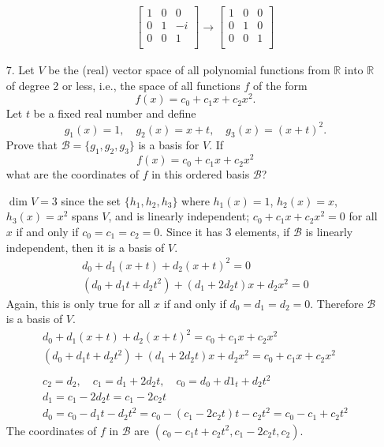 \documentclass{article}
\begin{document}
\begin{enumerate}[listparindent=\parindent]
\begin{enumerate}[listparindent=\parindent]
\begin{gather*}
\begin{bmatrix}
                1 & 0 & 0 \\
                0 & 1 & -i \\
                0 & 0 & 1 \\
            \end{bmatrix}
            \rightarrow
            \begin{bmatrix}
                1 & 0 & 0 \\
                0 & 1 & 0 \\
                0 & 0 & 1 \\
            \end{bmatrix}
        \end{gather*}

    \end{enumerate}

\item[7.] Let \(V\) be the (real) vector space of all polynomial functions from \(\mathbb{R}\) into \(\mathbb{R}\)
    of degree 2 or less, i.e., the space of all functions \(f\) of the form
    \[ f(x) = c_0 + c_1x + c_2x^2. \]
    Let \(t\) be a fixed real number and define
    \[g_1(x) = 1, \quad g_2(x) = x + t, \quad g_3(x) = (x + t)^2.\]
    Prove that \(\mathcal{B} = \{g_1, g_2, g_3\}\) is a basis for \(V\). If
    \[ f(x) = c_0 + c_1x + c_2x^2 \] what are the coordinates of \(f\) in this ordered basis \(\mathcal{B}\)?

    \(\dim V = 3\) since the set \(\{h_1, h_2, h_3\}\) where \(h_1(x) = 1\), \(h_2(x) = x\), \(h_3(x) = x^2\) spans \(V\),
    and is linearly independent; \(c_0 + c_1x + c_2x^2 = 0 \) for all \(x\) if and only if \(c_0 = c_1 = c_2 = 0\).
    Since it has 3 elements, if \(\mathcal{B}\) is linearly independent, then it is a basis of \(V\).
    \begin{gather*}
        d_0 + d_1(x + t) + d_2(x + t)^2 = 0 \\
        (d_0 + d_1t + d_2t^2) + (d_1 + 2d_2t)x + d_2x^2 = 0
    \end{gather*}
    Again, this is only true for all \(x\) if and only if \(d_0 = d_1 = d_2 = 0\). Therefore \(\mathcal{B}\) is a basis of \(V\).
    \begin{gather*}
        d_0 + d_1(x + t) + d_2(x + t)^2 = c_0 + c_1x + c_2x^2 \\
        (d_0 + d_1t + d_2t^2) + (d_1 + 2d_2t)x + d_2x^2 = c_0 + c_1x + c_2x^2 \\
        \\
        c_2 = d_2,\quad c_1 = d_1 + 2d_2t,\quad c_0 = d_0 + d1_t + d_2t^2 \\
        d_1 = c_1 - 2d_2t = c_1 - 2c_2t \\
        d_0 = c_0 - d_1t - d_2t^2 = c_0 - (c_1 - 2c_2t)t - c_2t^2 = c_0 - c_1 + c_2t^2
    \end{gather*}
    The coordinates of \(f\) in \(\mathcal{B}\) are \((c_0 - c_1t + c_2t^2, c_1 - 2c_2t, c_2)\).

\end{enumerate}
\end{document}
